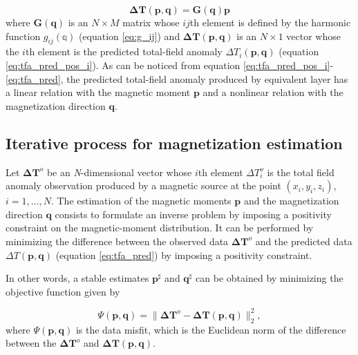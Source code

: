 \begin{equation}
 \mathbf{\Delta T} (\mathbf{p}, \mathbf{q}) = \mathbf{G}(\mathbf{q}) \mathbf{p}
\label{eq:tfa_pred}
\end{equation}
where $\mathbf{G}(\mathbf{q})$ is an $N \times M$ matrix whose $ij$th element is defined by the harmonic function $g_{ij}(\mathbb{q})$ (equation \ref{eq:g_ij}) and $\mathbf{\Delta T} (\mathbf{p}, \mathbf{q})$ is an $N \times 1$ vector whose the $i$th element is the predicted total-field anomaly $\Delta T_i (\mathbf{p},\mathbf{q})$ (equation \ref{eq:tfa_pred_pos_i}). As can be noticed from equation \ref{eq:tfa_pred_pos_i}-\ref{eq:tfa_pred}, the predicted total-field anomaly produced by equivalent layer has a linear relation with the magnetic moment $\mathbf{p}$ and a nonlinear relation with the magnetization direction $\mathbf{q}$. 

\subsection{Iterative process for magnetization estimation}


Let $\mathbf{\Delta T}^o$ be an \textit{N}-dimensional vector whose $i$th element $\Delta T_i^o$ is the total field anomaly observation produced by a magnetic source at the point $(x_i,y_i,z_i)$, $i = 1, \ldots, N$. The estimation of the magnetic moments $\mathbf{p}$ and the magnetization direction $\mathbf{q}$ consists to formulate an inverse problem by imposing a positivity constraint on the magnetic-moment distribution. It can be performed by minimizing the difference between the observed data $\mathbf{\Delta T}^o$ and the predicted data $\Delta T (\mathbf{p}, \mathbf{q})$ (equation \ref{eq:tfa_pred}) by imposing a positivity constraint. 

In other words, a stable estimates $\mathbf{p}^\sharp$ and $\mathbf{q}^\sharp$ can be obtained by minimizing the objective function given by

\begin{equation}
\Psi(\mathbf{p}, \mathbf{q}) =  \parallel \mathbf{\Delta T}^o - \mathbf{\Delta T} (\mathbf{p}, \mathbf{q}) \parallel_{2}^{2},
\label{eq:misfit}
\end{equation}
where $\Psi(\mathbf{p}, \mathbf{q})$ is the data misfit, which is the Euclidean norm of the difference between the $\mathbf{\Delta T}^o$ and $\mathbf{\Delta T} (\mathbf{p}, \mathbf{q})$.


